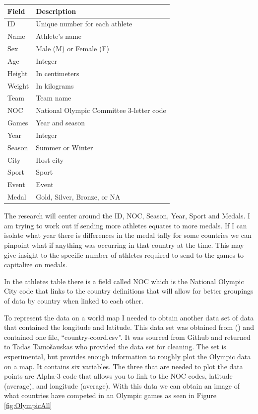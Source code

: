 \documentclass[
]{article}
\begin{document}
\begin{longtable}[t]{ll}
\toprule
Field & Description\\
\midrule
ID & Unique number for each athlete\\
Name & Athlete's name\\
Sex & Male (M) or Female (F)\\
Age & Integer\\
Height & In centimeters\\
\addlinespace
Weight & In kilograms\\
Team & Team name\\
NOC & National Olympic Committee 3-letter code\\
Games & Year and season\\
Year & Integer\\
\addlinespace
Season & Summer or Winter\\
City & Host city\\
Sport & Sport\\
Event & Event\\
Medal & Gold, Silver, Bronze, or NA\\
\bottomrule
\end{longtable}

The research will center around the ID, NOC, Season, Year, Sport and Medals. I am trying to work out if sending more athletes equates to more medals. If I can isolate what year there is differences in the medal tally for some countries we can pinpoint what if anything was occurring in that country at the time. This may give insight to the specific number of athletes required to send to the games to capitalize on medals.

In the athletes table there is a field called NOC which is the National Olympic City code that links to the country definitions that will allow for better groupings of data by country when linked to each other.

To represent the data on a world map I needed to obtain another data set of data that contained the longitude and latitude. This data set was obtained from () and contained one file, ``country-coord.csv''. It was sourced from Github and returned to Tadas Tamošauskas who provided the data set for cleaning. The set is experimental, but provides enough information to roughly plot the Olympic data on a map. It contains six variables. The three that are needed to plot the data points are Alpha-3 code that allows you to link to the NOC codes, latitude (average), and longitude (average). With this data we can obtain an image of what countries have competed in an Olympic games as seen in Figure \ref{fig:OlympicAll}
\end{document}
